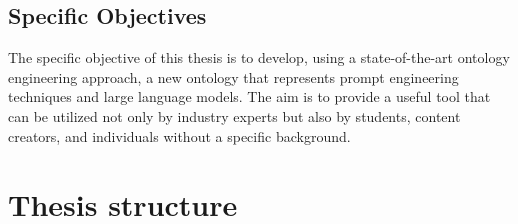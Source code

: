 \subsection{Specific Objectives}
The specific objective of this thesis is to develop, using a state-of-the-art ontology engineering approach, a new ontology that represents prompt engineering techniques and large language models. The aim is to provide a useful tool that can be utilized not only by industry experts but also by students, content creators, and individuals without a specific background.


\section{Thesis structure}
